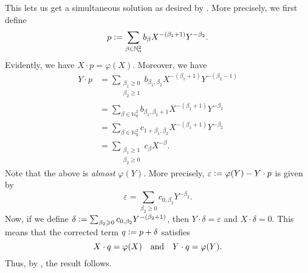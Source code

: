 \begin{obs}
	This lets us get a simultaneous solution as desired by . More precisely, we first define
	\begin{equation*} 
		p \vcentcolon= \sum_{\beta \in \mathbb{N}_{0}^{2}} b_{\beta} X^{-(\beta_{1} + 1)} Y^{-\beta_{2}}.
	\end{equation*}
	Evidently, we have $X \cdot p = \varphi(X)$. Moreover, we have
	\begin{align*} 
		Y \cdot p &= \sum_{\substack{\beta_{1} \ge 0 \\ \beta_{2} \ge 1}} b_{\beta_{1}, \beta_{2}} X^{-(\beta_{1} + 1)} Y^{-(\beta_{2} - 1)} \\
		&= \sum_{\beta \in \mathbb{N}_{0}^{2}} b_{\beta_{1}, \beta_{2} + 1} X^{-(\beta_{1} + 1)} Y^{-\beta_{2}} \\
		&= \sum_{\beta \in \mathbb{N}_{0}^{2}} c_{1 + \beta_{1}, \beta_{2}} X^{-(\beta_{1} + 1)} Y^{-\beta_{2}} \\
		&= \sum_{\substack{\beta_{1} \ge 1 \\ \beta_{2} \ge 0}} c_{\beta} X^{-\beta}.
	\end{align*}
	Note that the above is \emph{almost} $\varphi(Y)$. More precisely, $\varepsilon \vcentcolon= \varphi(Y) - Y \cdot p$ is given by
	\begin{equation*} 
		\varepsilon = \sum_{\beta_{2} \ge 0} c_{0, \beta_{2}} Y^{-\beta_{2}}.
	\end{equation*}
	Now, if we define $\delta \vcentcolon= \sum_{\beta_{2} \ge 0} c_{0, \beta_{2}} Y^{-(\beta_{2} + 1)}$, then $Y \cdot \delta = \varepsilon$ and $X \cdot \delta = 0$. This means that the corrected term $q \vcentcolon= p + \delta$ satisfies
	\begin{equation*} 
		X \cdot q = \varphi(X) \andd Y \cdot q = \varphi(Y).
	\end{equation*}
	Thus, by , the result follows.
\end{obs}

